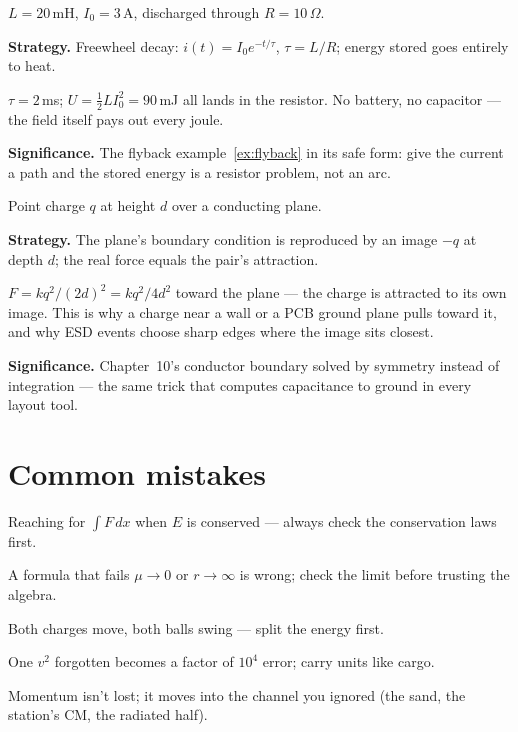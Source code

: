 \begin{example}\label{ex:w45}
$L=20$\,mH, $I_0=3$\,A, discharged through $R=10\,\Omega$.
\par\smallskip
\textbf{Strategy.} Freewheel decay: $i(t)=I_0e^{-t/\tau}$,
$\tau=L/R$; energy stored goes entirely to heat.
\begin{solution}
$\tau=2$\,ms; $U=\tfrac12LI_0^{2}=90$\,mJ all lands in the resistor.
No battery, no capacitor --- the field itself pays out every joule.
\checkmark
\end{solution}
\textbf{Significance.} The flyback example~\ref{ex:flyback} in its
safe form: give the current a path and the stored energy is a resistor
problem, not an arc.
\end{example}

\begin{example}\label{ex:w46}
Point charge $q$ at height $d$ over a conducting plane.
\par\smallskip
\textbf{Strategy.} The plane's boundary condition is reproduced by an
image $-q$ at depth $d$; the real force equals the pair's attraction.
\begin{solution}
$F=kq^{2}/(2d)^{2}=kq^{2}/4d^{2}$ toward the plane --- the charge is
attracted to its own image. This is why a charge near a wall or a PCB
ground plane pulls toward it, and why ESD events choose sharp edges
where the image sits closest. \checkmark
\end{solution}
\textbf{Significance.} Chapter~10's conductor boundary solved by
symmetry instead of integration --- the same trick that computes
capacitance to ground in every layout tool.
\end{example}

\section{Common mistakes}\label{sec:ws-mistakes}

\begin{tripwire}
Reaching for $\int F\,dx$ when $E$ is conserved --- always check the
conservation laws first.
\end{tripwire}
\begin{tripwire}
A formula that fails $\mu\to0$ or $r\to\infty$ is wrong; check the
limit before trusting the algebra.
\end{tripwire}
\begin{tripwire}
Both charges move, both balls swing --- split the energy first.
\end{tripwire}
\begin{tripwire}
One $v^{2}$ forgotten becomes a factor of $10^{4}$ error; carry units
like cargo.
\end{tripwire}
\begin{tripwire}
Momentum isn't lost; it moves into the channel you ignored (the sand,
the station's CM, the radiated half).
\end{tripwire}

